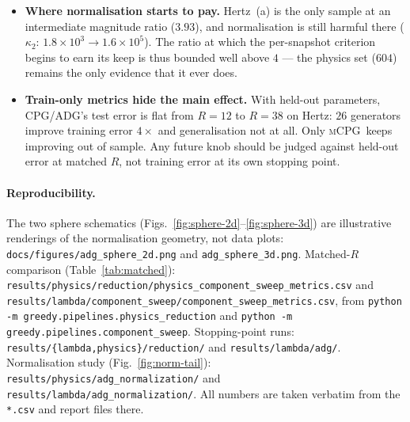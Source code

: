 \documentclass[11pt]{article}
\newcommand{\CPG}{\textsc{CPG}}
\newcommand{\ADG}{\textsc{ADG}}
\newcommand{\mCPG}{\textsc{mCPG}}
\begin{document}
\begin{itemize}
        ratio is near $1$ ($R$: $38\to42$, $\kappa_2$: $5.5\times10^{9}\to
        4.6\times10^{11}$ on Hertz), so the standard \ADG\ is itself conditional
        on the regime;
        (ii) \textbf{$\CPG\equiv\ADG$ is not a law} (Sec.~\ref{sec:contact-new}).
        It holds on lambda, Hertz and Hertz~(b), but breaks on Hertz~(a) at
        $\varepsilon=0.05$, where \ADG\ makes a different --- and $2.1\times$
        worse --- held-out choice at the same $R=4$. Plain \ADG\ ties or loses to
        \CPG\ on every dataset tested; it never wins.
  \item \textbf{Where normalisation starts to pay.} Hertz~(a) is the only sample
        at an intermediate magnitude ratio ($3.93$), and normalisation is still
        harmful there ($\kappa_2$: $1.8\times10^{3}\to1.6\times10^{5}$). The
        ratio at which the per-snapshot criterion begins to earn its keep is thus
        bounded well above $4$ --- the physics set ($604$) remains the only
        evidence that it ever does.
  \item \textbf{Train-only metrics hide the main effect.} With held-out
        parameters, \CPG/\ADG's test error is flat from $R=12$ to $R=38$ on Hertz:
        $26$ generators improve training error $4\times$ and generalisation not at
        all. Only \mCPG\ keeps improving out of sample. Any future knob should be
        judged against held-out error at matched $R$, not training error at its
        own stopping point.
\end{itemize}

\paragraph{Reproducibility.}
The two sphere schematics (Figs.~\ref{fig:sphere-2d}--\ref{fig:sphere-3d}) are
illustrative renderings of the normalisation geometry, not data plots:
\texttt{docs/figures/adg\_sphere\_2d.png} and \texttt{adg\_sphere\_3d.png}.
Matched-$R$ comparison (Table~\ref{tab:matched}):
\texttt{results/physics/reduction/physics\_component\_sweep\_metrics.csv} and
\texttt{results/lambda/component\_sweep/component\_sweep\_metrics.csv}, from
\texttt{python -m greedy.pipelines.physics\_reduction} and
\texttt{python -m greedy.pipelines.component\_sweep}. Stopping-point runs:
\texttt{results/\{lambda,physics\}/reduction/} and \texttt{results/lambda/adg/}.
Normalisation study (Fig.~\ref{fig:norm-tail}):
\texttt{results/physics/adg\_normalization/} and
\texttt{results/lambda/adg\_normalization/}. All numbers are taken verbatim from
the \texttt{*.csv} and report files there.
\end{document}
